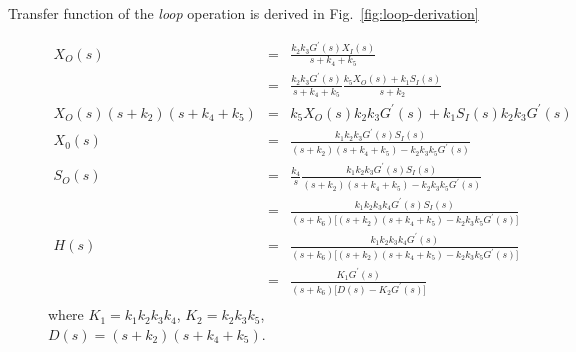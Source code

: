 \documentclass[unnumsec,webpdf,contemporary,large]{oup-authoring-template}%
\theoremstyle{thmstyleone}%
\theoremstyle{thmstyletwo}%
\theoremstyle{thmstylethree}%
\begin{document}
Transfer function of the {\em loop} operation is derived in
Fig.~\ref{fig:loop-derivation}
\begin{figure}
\begin{eqnarray}
X_O (s) & = & \frac{k_2 k_3  G^{\prime} (s) X_I(s)}{s + k_4 + k_5}  \nonumber \\
  &= &  \frac{k_2 k_3  G^{\prime} (s)}{s + k_4 + k_5} \frac{k_5 X_O(s) + k_1 S_I (s)}{s + k_2} \nonumber \\
X_O (s) (s + k_2) (s + k_4 + k_5)  & = &
  k_5 X_O(s) k_2 k_3  G^{\prime}(s) + k_1 S_I (s) k_2 k_3 G^{\prime}(s) \nonumber \\
X_0 (s) & = & \frac{ k_1  k_2 k_3 G^{\prime}(s) S_I (s)}
{(s + k_2) (s + k_4 + k_5) - k_2 k_3 k_5 G^{\prime} (s) } \nonumber \\
S_O (s) & = & \frac{k_4}{s} \frac{ k_1  k_2 k_3 G^{\prime}(s) S_I (s)}
  {(s + k_2) (s + k_4 + k_5) - k_2 k_3 k_5 G^{\prime}(s)} \nonumber \\
   & = & \frac{ k_1  k_2 k_3 k_4 G^{\prime}(s) S_I (s)}
  {(s + k_6) \lbrack (s + k_2) (s + k_4 + k_5) - k_2 k_3 k_5 G^{\prime} (s) \rbrack } \nonumber \\
H(s) & = & \frac{ k_1  k_2 k_3 k_4 G^{\prime} (s)}
  {(s + k_6) \lbrack (s + k_2) (s + k_4 + k_5) - k_2 k_3 k_5 G^{\prime} (s) \rbrack } \nonumber \\
  & = & \frac{ K_1 G^{\prime} (s)}
  {(s + k_6) \lbrack D(s) - K_2 G^{\prime} (s)\rbrack  } \nonumber \\
\end{eqnarray}
where $K_1 = k_1 k_2 k_3 k_4$, $K_2 = k_2 k_3 k_5$, $D(s) = (s + k_2) (s + k_4 + k_5)$.


\end{figure}
\end{document}
